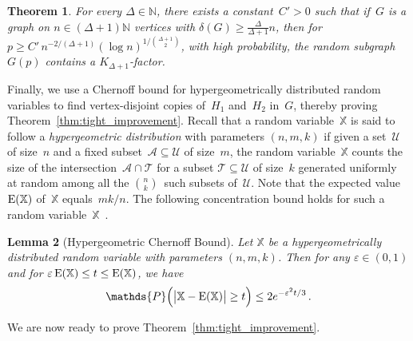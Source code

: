 \documentclass[final]{article}
\newtheorem{theorem}{Theorem}[section]
\newtheorem{lemma}[theorem]{Lemma}
\theoremstyle{definition}
\newcommand{\eps}{\varepsilon}
\begin{document}
\begin{theorem}
\label{thm:toolkit_robust}
For every $\Delta \in \mathbb{N}$, there exists a constant~$C' > 0$ such that if~$G$ is a graph on $n \in (\Delta+1)\mathbb{N}$ vertices with $\delta(G) \geq \frac{\Delta}{\Delta+1}n$, then for $p \geq C'\, n^{-2/(\Delta+1)} (\log n)^{1/\binom{\Delta+1}{2}}$, with high probability, the random subgraph $G(p)$ contains a $K_{\Delta+1}$-factor.
\end{theorem}

Finally, we use a Chernoff bound for hypergeometrically distributed random variables to find vertex-disjoint copies of~$H_1$ and~$H_2$ in~$G$, thereby proving Theorem~\ref{thm:tight_improvement}. Recall that a random variable~$\mathbb{X}$ is said to follow a \emph{hypergeometric distribution} with parameters $(n, m, k)$ if given a set~$\mathcal{U}$ of size~$n$ and a fixed subset~$\mathcal{A} \subseteq \mathcal{U}$ of size~$m$, the random variable~$\mathbb{X}$ counts the size of the intersection~$\mathcal{A} \cap \mathcal{T}$ for a subset $\mathcal{T} \subseteq \mathcal{U}$ of size~$k$ generated uniformly at random among all the $\binom{n}{k}$~such subsets of~$\mathcal{U}$. Note that the expected value~${\rm E}(\mathbb{X})$ of~$\mathbb{X}$ equals~$mk/n$. 
The following concentration bound holds for such a random variable~$\mathbb{X}$~\cite[Chapter 2]{Random_graphs_textbook_janson}.

\begin{lemma}
[Hypergeometric Chernoff Bound]
\label{lem:chern_hypgeom}
Let $\mathbb{X}$ be a hypergeometrically distributed random variable with parameters $(n, m, k)$. Then for any $\eps \in (0,1)$ and for $\eps\,{\rm E}(\mathbb{X})\leq t \leq {\rm E}(\mathbb{X})$, we have
$$\mathds{P}\Bigl(\bigl|\mathbb{X} - {\rm E}(\mathbb{X})\bigr| \geq t \Bigr) \leq 2e^{-\eps^2t/3}\,.$$
\end{lemma}

We are now ready to prove Theorem~\ref{thm:tight_improvement}.
\end{document}
